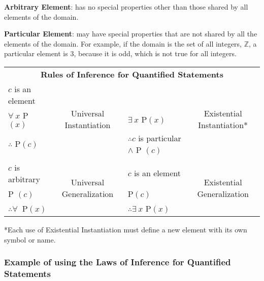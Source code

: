 \textbf{Arbitrary Element}: has no special properties other than those shared by all elements of the domain.

\textbf{Particular Element}: may have special properties that are not shared by all the elements of the domain.
For example, if the domain is the set of all integers, $\mathbb{Z}$, a particular element is 3, because it is odd,
which is not true for all integers.

\begin{center}
  \begin{tabular}{lclc}
    \multicolumn{4}{c}{\textbf{Rules of Inference for Quantified Statements}}                                                                                             \\
    $c$ is an element           & \multirow{3}{*}{Universal Instantiation}  &                                               & \multirow{3}{*}{Existential Instantiation*} \\
    $\forall~ x$ P $(x)$         &                                           & $\exists~ x$ P$(x)$                            &                                             \\
    \hhline{-~-~}
    $\therefore$ P$(c)$         &                                           & $\therefore c$ is particular  $\land$ P $(c)$ &                                             \\
    \\
    $c$ is arbitrary            & \multirow{3}{*}{Universal Generalization} & $c$ is an element                             & \multirow{3}{*}{Existential Generalization} \\
    P $(c)$                     &                                           & P$(c)$                                        &                                             \\
    \hhline{-~-~}
    $\therefore \forall~$ P$(x)$ &                                           & $\therefore \exists~ x$ P$(x)$                 &                                             \\
  \end{tabular}
\end{center}

*Each use of Existential Instantiation must define a new element with its own symbol or name.

\subsubsection*{Example of using the Laws of Inference for Quantified Statements}

